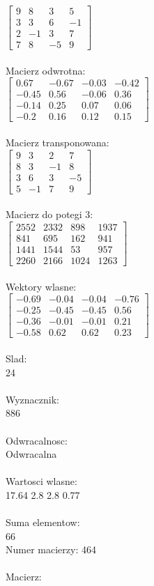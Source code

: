 \documentclass[a4paper,12pt]{article}
\begin{document}
$\begin{bmatrix} 9&8&3&5\\3&3&6&-1\\2&-1&3&7\\7&8&-5&9 \end{bmatrix}$
\\
\\
Macierz odwrotna:\\

$\begin{bmatrix} 0.67&-0.67&-0.03&-0.42\\-0.45&0.56&-0.06&0.36\\-0.14&0.25&0.07&0.06\\-0.2&0.16&0.12&0.15 \end{bmatrix}$
\\
\\
Macierz transponowana:\\

$\begin{bmatrix} 9&3&2&7\\8&3&-1&8\\3&6&3&-5\\5&-1&7&9 \end{bmatrix}$
\\
\\
Macierz do potegi 3:\\

$\begin{bmatrix} 2552&2332&898&1937\\841&695&162&941\\1441&1544&53&957\\2260&2166&1024&1263 \end{bmatrix}$
\\
\\
Wektory wlasne:\\

$\begin{bmatrix} -0.69&-0.04&-0.04&-0.76\\-0.25&-0.45&-0.45&0.56\\-0.36&-0.01&-0.01&0.21\\-0.58&0.62&0.62&0.23 \end{bmatrix}$
\\
\\
Slad:\\
24
\\
\\
Wyznacznik:\\
886
\\
\\
Odwracalnosc:\\
Odwracalna
\\
\\
Wartosci wlasne:\\
17.64 2.8 2.8 0.77
\\
\\
Suma elementow:\\
66
\\
\newpage
Numer macierzy:
464
\\
\\
Macierz:\\
\end{document}

